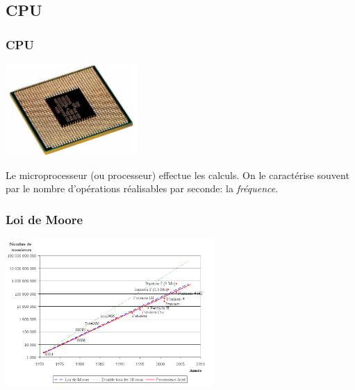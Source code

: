 \documentclass[svgnames,11pt]{beamer}
\begin{document}
\subsection{CPU}
\begin{frame}
    \frametitle{CPU}

    \begin{center}
    \centering
    \includegraphics[width=5cm]{ressources/processeur.jpg}
    \label{IMG}
    \end{center}
\begin{aretenir}[]
Le microprocesseur (ou processeur) effectue les calculs. On le caractérise souvent par le nombre d'opérations réalisables par seconde: la \emph{fréquence}.
\end{aretenir}
\end{frame}
\begin{frame}
    \frametitle{Loi de Moore}

    \begin{center}
    \centering
    \includegraphics[width=8cm]{ressources/Loi_de_Moore.png}
    \label{IMG}
    \end{center}

\end{frame}
\end{document}
